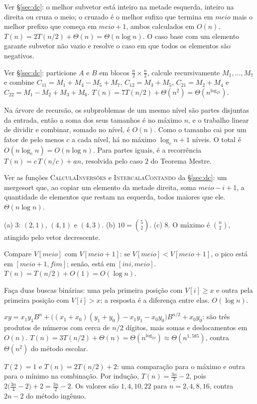  Ver §\ref{sec:dc}: o melhor subvetor está inteiro na metade esquerda, inteiro na direita ou cruza o meio; o cruzado é o melhor sufixo que termina em $meio$ mais o melhor prefixo que começa em $meio+1$, ambos calculados em $O(n)$. $T(n)=2T(n/2)+\Theta(n)=\Theta(n\log n)$. O caso base com um elemento garante subvetor não vazio e resolve o caso em que todos os elementos são negativos.

 Ver §\ref{sec:dc}: particione $A$ e $B$ em blocos $\frac n2\times\frac n2$, calcule recursivamente $M_1,\dots,M_7$ e combine $C_{11}=M_1+M_4-M_5+M_7$, $C_{12}=M_3+M_5$, $C_{21}=M_2+M_4$ e $C_{22}=M_1-M_2+M_3+M_6$. $T(n)=7T(n/2)+\Theta(n^2)=\Theta(n^{\log_27})$.

 Na árvore de recursão, os subproblemas de um mesmo nível são partes disjuntas da entrada, então a soma dos seus tamanhos é no máximo $n$, e o trabalho linear de dividir e combinar, somado no nível, é $O(n)$. Como o tamanho cai por um fator de pelo menos $c$ a cada nível, há no máximo $\log_cn+1$ níveis. O total é $O(n\log_cn)=O(n\log n)$. Para partes iguais, é a recorrência $T(n)=c\,T(n/c)+an$, resolvida pelo caso 2 do Teorema Mestre.

 Ver as funções \textsc{CalculaInversões} e \textsc{IntercalaContando} da §\ref{sec:dc}: um mergesort que, ao copiar um elemento da metade direita, soma $meio-i+1$, a quantidade de elementos que restam na esquerda, todos maiores que ele. $\Theta(n\log n)$.

 (a) 3: $(2,1)$, $(4,1)$ e $(4,3)$. (b) $10=\binom52$. (c) 8. O máximo é $\binom n2$, atingido pelo vetor decrescente.

 Compare $V[meio]$ com $V[meio+1]$: se $V[meio]<V[meio+1]$, o pico está em $[meio+1,fim]$; senão, está em $[ini,meio]$. $T(n)=T(n/2)+O(1)=O(\log n)$.

 Faça duas buscas binárias: uma pela primeira posição com $V[i]\ge x$ e outra pela primeira posição com $V[i]>x$; a resposta é a diferença entre elas. $O(\log n)$.

 $xy=x_1y_1B^n+\big((x_1+x_0)(y_1+y_0)-x_1y_1-x_0y_0\big)B^{n/2}+x_0y_0$: são três produtos de números com cerca de $n/2$ dígitos, mais somas e deslocamentos em $O(n)$. $T(n)=3T(n/2)+\Theta(n)=\Theta(n^{\log_23})\approx\Theta(n^{1{,}585})$, contra $\Theta(n^2)$ do método escolar.

 $T(2)=1$ e $T(n)=2T(n/2)+2$: uma comparação para o máximo e outra para o mínimo na combinação. Por indução, $T(n)=\frac{3n}2-2$, pois $2\big(\frac{3n}4-2\big)+2=\frac{3n}2-2$. Os valores são $1,4,10,22$ para $n=2,4,8,16$, contra $2n-2$ do método ingênuo.

